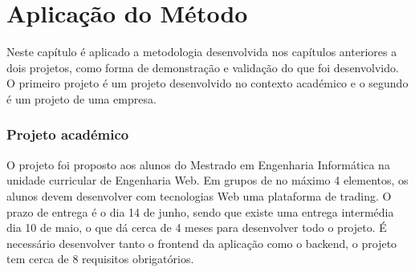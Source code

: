 \chapter{Aplicação do Método}
\label{cht:aplicacao}

Neste capítulo é aplicado a metodologia desenvolvida nos capítulos anteriores a dois projetos, como forma de demonstração e validação do que foi desenvolvido.
\\O primeiro projeto é um projeto desenvolvido no contexto académico e o segundo é um projeto de uma empresa.

\vspace{5mm}

\subsection{Projeto académico}

O projeto foi proposto aos alunos do Mestrado em Engenharia Informática na unidade curricular de Engenharia Web. Em grupos de no máximo 4 elementos, os alunos devem desenvolver com tecnologias Web uma plataforma de trading. O prazo de entrega é o dia 14 de junho, sendo que existe uma entrega intermédia dia 10 de maio, o que dá cerca de 4 meses para desenvolver todo o projeto. É necessário desenvolver tanto o frontend da aplicação como o backend, o projeto tem cerca de 8 requisitos obrigatórios.

